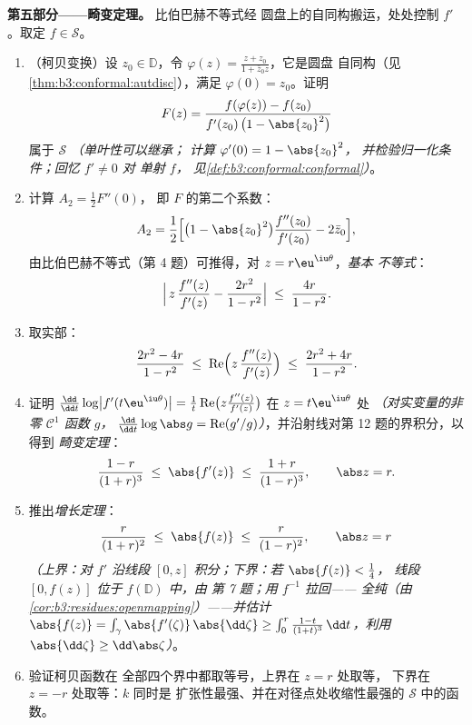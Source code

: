 \begin{problem}
\medskip
\noindent\textbf{第五部分——畸变定理。}
比伯巴赫不等式经
圆盘上的自同构搬运，处处控制 $f'$。取定 $f \in \mathcal
S$。
\begin{enumerate}[resume]
  \item （柯贝变换）设 $z_0 \in \mathbb D$，令
        $\varphi(z) = \frac{z + z_0}{1 + \bar z_0z}$，它是圆盘
        自同构（见\cref{thm:b3:conformal:autdisc}），满足
        $\varphi(0) = z_0$。证明
        \[
        F(z) = \frac{f(\varphi(z)) - f(z_0)}
        {f'(z_0)\,\bigl(1 - \abs{z_0}^2\bigr)}
        \]
        属于 $\mathcal S$ \emph{（单叶性可以继承；
        计算 $\varphi'(0) = 1 - \abs{z_0}^2$，
        并检验归一化条件；回忆 $f' \neq 0$ 对
        单射 $f$，
        见\cref{def:b3:conformal:conformal}）}。
  \item 计算 $A_2 = \frac12F''(0)$，
        即 $F$ 的第二个系数：
        \[
        A_2 = \frac12\Bigl[\bigl(1 - \abs{z_0}^2\bigr)
        \frac{f''(z_0)}{f'(z_0)} - 2\bar z_0\Bigr] ,
        \]
        由比伯巴赫不等式（第 4 题）可推得，对 $z =
        r\eu^{\iu\theta}$，\emph{基本
        不等式}：
        \[
        \Bigl|\,z\,\frac{f''(z)}{f'(z)} -
        \frac{2r^2}{1 - r^2}\Bigr|
        \;\leq\; \frac{4r}{1 - r^2} .
        \]
  \item 取实部：
        \[
        \frac{2r^2 - 4r}{1 - r^2} \;\leq\;
        \operatorname{Re}\Bigl(z\,\frac{f''(z)}{f'(z)}\Bigr)
        \;\leq\; \frac{2r^2 + 4r}{1 - r^2} .
        \]
  \item 证明 $\frac{\dd}{\dd t}\log\bigl|
        f'(t\eu^{\iu\theta})\bigr| = \frac1t
        \operatorname{Re}\bigl(z\frac{f''(z)}{f'(z)}\bigr)$
        在 $z = t\eu^{\iu\theta}$ 处 \emph{（对实变量的非零
        $\mathcal C^1$ 函数 $g$，
        $\frac{\dd}{\dd t}\log\abs g =
        \operatorname{Re}(g'/g)$）}，并沿射线对第
        12 题的界积分，以得到
        \emph{畸变定理}：
        \[
        \frac{1 - r}{(1 + r)^3} \;\leq\; \abs{f'(z)}
        \;\leq\; \frac{1 + r}{(1 - r)^3},
        \qquad \abs z = r .
        \]
  \item 推出\emph{增长定理}：
        \[
        \frac{r}{(1 + r)^2} \;\leq\; \abs{f(z)} \;\leq\;
        \frac{r}{(1 - r)^2},
        \qquad \abs z = r
        \]
        \emph{（上界：对 $f'$ 沿线段
        $[0, z]$ 积分；下界：若 $\abs{f(z)} < \frac14$，
        线段 $[0, f(z)]$ 位于 $f(\mathbb D)$ 中，由
        第 7 题；用 $f^{-1}$ 拉回——
        全纯（由
        \cref{cor:b3:residues:openmapping}）——并估计
        $\abs{f(z)} = \int_\gamma\abs{f'(\zeta)}
        \,\abs{\dd\zeta} \geq \int_0^r\frac{1 - t}{(1 +
        t)^3}\,\dd t$，利用 $\abs{\dd\zeta} \geq
        \dd\abs\zeta$）}。
  \item 验证柯贝函数在
        全部四个界中都取等号，上界在 $z = r$ 处取等，
        下界在 $z = -r$ 处取等：$k$ 同时是
        扩张性最强、并在对径点处收缩性最强的
        $\mathcal S$ 中的函数。
\end{enumerate}


\end{problem}
